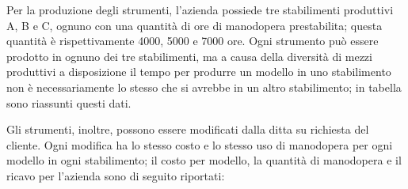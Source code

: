 Per la produzione degli strumenti, l'azienda possiede tre stabilimenti produttivi A, B e C, ognuno con una quantità di ore di manodopera prestabilita; questa quantità è rispettivamente 4000, 5000 e 7000 ore. Ogni strumento può essere prodotto in ognuno dei tre stabilimenti, ma a causa della diversità di mezzi produttivi a disposizione il tempo per produrre un modello in uno stabilimento non è necessariamente lo stesso che si avrebbe in un altro stabilimento; in tabella sono riassunti questi dati.

\begin{table}[htbp]
\begin{center}
\end{center}
\end{table}

Gli strumenti, inoltre, possono essere modificati dalla ditta su richiesta del cliente. Ogni modifica ha lo stesso costo e lo stesso uso di manodopera per ogni modello in ogni stabilimento; il costo per modello, la quantità di manodopera e il ricavo per l'azienda sono di seguito riportati:

